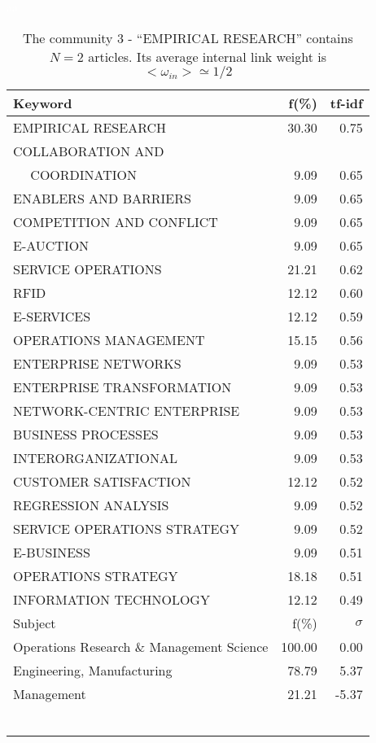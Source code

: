 \documentclass[a4paper,11pt]{report}
\begin{document}
\begin{landscape}
\begin{table}[!ht]
\caption{The community 3 - ``EMPIRICAL RESEARCH'' contains $N = 2$ articles. Its average internal link weight is $<\omega_{in}> \simeq 1/2$ }
\textcolor{white}{aa}\\
{\scriptsize\begin{tabular}{|l r  r|}
\hline
Keyword & f(\%) & tf-idf \\
\hline
EMPIRICAL RESEARCH & 30.30 & 0.75\\
COLLABORATION AND &  &\\
$\quad$ COORDINATION & 9.09 & 0.65\\
ENABLERS AND BARRIERS & 9.09 & 0.65\\
COMPETITION AND CONFLICT & 9.09 & 0.65\\
E-AUCTION & 9.09 & 0.65\\
SERVICE OPERATIONS & 21.21 & 0.62\\
RFID & 12.12 & 0.60\\
E-SERVICES & 12.12 & 0.59\\
OPERATIONS MANAGEMENT & 15.15 & 0.56\\
ENTERPRISE NETWORKS & 9.09 & 0.53\\
ENTERPRISE TRANSFORMATION & 9.09 & 0.53\\
NETWORK-CENTRIC ENTERPRISE & 9.09 & 0.53\\
BUSINESS PROCESSES & 9.09 & 0.53\\
INTERORGANIZATIONAL & 9.09 & 0.53\\
CUSTOMER SATISFACTION & 12.12 & 0.52\\
REGRESSION ANALYSIS & 9.09 & 0.52\\
SERVICE OPERATIONS STRATEGY & 9.09 & 0.52\\
E-BUSINESS & 9.09 & 0.51\\
OPERATIONS STRATEGY & 18.18 & 0.51\\
INFORMATION TECHNOLOGY & 12.12 & 0.49\\
\hline
\hline
Subject & f(\%) & $\sigma$\\
\hline
Operations Research \& Management Science & 100.00 & 0.00\\
Engineering, Manufacturing & 78.79 & 5.37\\
Management & 21.21 & -5.37\\
 &  & \\
 &  & \\
 &  & \\
 &  & \\
 &  & \\
 &  & \\

\end{tabular}}
\end{table}
\end{landscape}
\end{document}
